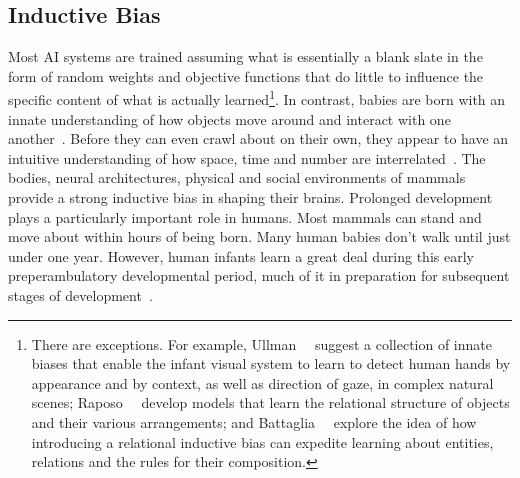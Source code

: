 
\subsection{Inductive Bias}


Most AI systems are trained assuming what is essentially a blank slate in the form of random weights and objective functions that do little to influence the specific content of what is actually learned\footnote{%
%
  There are exceptions. For example, Ullman~\etal~\cite{UllmanetalPNAS-12} suggest a collection of innate biases that enable the infant visual system to learn to detect human hands by appearance and by context, as well as direction of gaze, in complex natural scenes; Raposo~\etal~\cite{RaposoetalCSC-17} develop models that learn the relational structure of objects and their various arrangements; and Battaglia~\etal~\cite{BattagliaetalCoRR-18} explore the idea of how introducing a relational inductive bias can expedite learning about entities, relations and the rules for their composition.}.
%
In contrast, babies are born with an innate understanding of how objects move around and interact with one another~\cite{Dehaene-LambertzandSpelkeNEURON-15}. Before they can even crawl about on their own, they appear to have an intuitive understanding of how space, time and number are interrelated~\cite{deHeviaetalPNAS-14,HauserandSpelkeTCN-04}. 
%
The bodies, neural architectures, physical and social environments of mammals provide a strong inductive bias in shaping their brains. Prolonged development plays a particularly important role in humans. Most mammals can stand and move about within hours of being born. Many human babies don't walk until just under one year. However, human infants learn a great deal during this early preperambulatory developmental period, much of it in preparation for subsequent stages of development~\cite{MacLeanPNAS-16,RosatietalEVOLUTIONARY-PSYCHOLOGY-14}.


